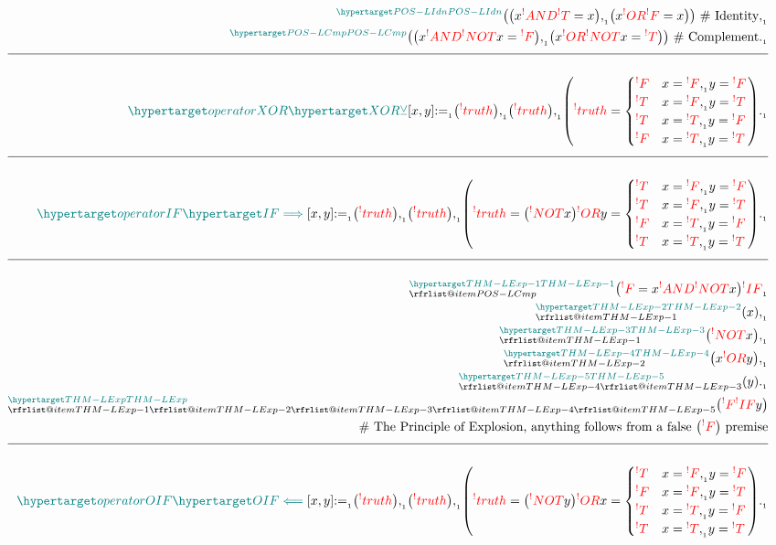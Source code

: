 \documentclass[a4paper]{article}
\makeatletter
\def\ml{\mleft}
\def\mr{\mright}
\newcommand{\defeq}{:=}
\newcommand{\cusnum}[2]{{#1}_{{\phantom{ }}_{#2}}}
\newcommand{\cusand}{,}
\newcommand{\cuspop}{.}
\newcommand{\eqComment}[1]{\text{  \# #1}}
\newcommand{\n}{\\[1.5ex] \hline \nonumber \\[0ex]}
\newcommand{\m}{\nonumber \\}
\newcommand\rfrlist[1]{%
    \forcsvlist{\rfrlist@item}{#1}
}
\newcommand\rfrlist@item[1]{\rfr{#1}\\}
\newcommand{\thmlink}[2]{{}_{\substack{\rfrlist{#1}}}^{\dfn{#2}} }
\makeatother
\begin{document}
\begin{tcolorbox}
\begin{align}
\m \thmlink{}{POS-LIdn} \ml(\ml(x \rfr{AND} \rfr{T} = x\mr) \cusnum{\cusand}{1} \ml(x \rfr{OR} \rfr{F} = x\mr)\mr) \eqComment{Identity} \cusnum{\cusand}{1}
\m \thmlink{}{POS-LCmp} \ml(\ml(x \rfr{AND} \rfr{NOT} x = \rfr{F}\mr) \cusnum{\cusand}{1} \ml(x \rfr{OR} \rfr{NOT} x = \rfr{T}\mr)\mr) \eqComment{Complement} \cusnum{\cuspop}{1}
\n \dfn{operatorXOR} [\dfn{XOR}[\veebar]][x, y] \cusnum{\defeq}{1} \ml(\rfr{truth} [x][]\mr) \cusnum{\cusand}{1} \ml(\rfr{truth} [y][]\mr) \cusnum{\cusand}{1} \ml(\rfr{truth} [x \rfr{XOR} y][] = \begin{cases} \rfr{F} & x = \rfr{F} \cusnum{\cusand}{1} y = \rfr{F} \\ \rfr{T} & x = \rfr{F} \cusnum{\cusand}{1} y = \rfr{T} \\ \rfr{T} & x = \rfr{T} \cusnum{\cusand}{1} y = \rfr{F} \\ \rfr{F} & x = \rfr{T} \cusnum{\cusand}{1} y = \rfr{T} \end{cases}\mr) \cusnum{\cuspop}{1}
\n \dfn{operatorIF} [\dfn{IF}[\implies]][x, y] \cusnum{\defeq}{1} \ml(\rfr{truth} [x][]\mr) \cusnum{\cusand}{1} \ml(\rfr{truth} [y][]\mr) \cusnum{\cusand}{1} \ml(\rfr{truth} [x \rfr{IF} y][] = \ml(\rfr{NOT} x\mr) \rfr{OR} y = \begin{cases} \rfr{T} & x = \rfr{F} \cusnum{\cusand}{1} y = \rfr{F} \\ \rfr{T} & x = \rfr{F} \cusnum{\cusand}{1} y = \rfr{T} \\ \rfr{F} & x = \rfr{T} \cusnum{\cusand}{1} y = \rfr{F} \\ \rfr{T} & x = \rfr{T} \cusnum{\cusand}{1} y = \rfr{T} \end{cases}\mr) \cusnum{\cuspop}{1}
\n \thmlink{POS-LCmp}{THM-LExp-1} \ml(\rfr{F} = x \rfr{AND} \rfr{NOT} x\mr) \cusnum{\rfr{IF}}{1}
\m \thmlink{THM-LExp-1}{THM-LExp-2} \ml(x\mr) \cusnum{\cusand}{1}
\m \thmlink{THM-LExp-1}{THM-LExp-3} \ml(\rfr{NOT} x\mr) \cusnum{\cusand}{1}
\m \thmlink{THM-LExp-2}{THM-LExp-4} \ml(x \rfr{OR} y\mr) \cusnum{\cusand}{1}
\m \thmlink{THM-LExp-4, THM-LExp-3}{THM-LExp-5} \ml(y\mr) \cusnum{\cuspop}{1}
\m \thmlink{THM-LExp-1, THM-LExp-2, THM-LExp-3, THM-LExp-4, THM-LExp-5}{THM-LExp} \ml(\rfr{F} \rfr{IF} y\mr)
\m \eqComment{The Principle of Explosion, anything follows from a false $\ml(\rfr{F}\mr)$ premise}
\n \dfn{operatorOIF} [\dfn{OIF}[\impliedby]][x, y] \cusnum{\defeq}{1} \ml(\rfr{truth} [x][]\mr) \cusnum{\cusand}{1} \ml(\rfr{truth} [y][]\mr) \cusnum{\cusand}{1} \ml(\rfr{truth} [x \rfr{OIF} y][] = \ml(\rfr{NOT} y\mr) \rfr{OR} x = \begin{cases} \rfr{T} & x = \rfr{F} \cusnum{\cusand}{1} y = \rfr{F} \\ \rfr{F} & x = \rfr{F} \cusnum{\cusand}{1} y = \rfr{T} \\ \rfr{T} & x = \rfr{T} \cusnum{\cusand}{1} y = \rfr{F} \\ \rfr{T} & x = \rfr{T} \cusnum{\cusand}{1} y = \rfr{T} \end{cases}\mr) \cusnum{\cuspop}{1}

\end{align}
\end{tcolorbox}
\end{document}
